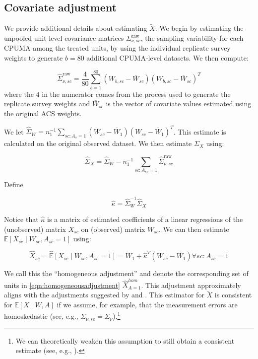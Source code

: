 \subsection{Covariate adjustment}

We provide additional details about estimating $\tilde{X}$. We begin by estimating the unpooled unit-level covariance matrices $\Sigma_{\nu, sc}^{\text{raw}}$, the sampling variability for each CPUMA among the treated units, by using the individual replicate survey weights to generate $b = 80$ additional CPUMA-level datasets. We then compute:

\begin{equation}
\hat{\Sigma}_{\nu, sc}^{\text{raw}} = \frac{4}{80}\sum_{b=1}^{80}(W_{b, sc} - \bar{W}_{sc})(W_{b, sc} - \bar{W}_{sc})^T
\end{equation}
%
where the $4$ in the numerator comes from the process used to generate the replicate survey weights and $\bar{W}_{sc}$ is the vector of covariate values estimated using the original ACS weights.

We let $\hat{\Sigma}_{W} = n_1^{-1}\sum_{sc: A_s = 1} (W_{sc} - \bar{W}_1)(W_{sc} - \bar{W}_1)^T$. This estimate is calculated on the original observed dataset. We then estimate $\Sigma_{X}$ using:

\begin{equation}
\hat{\Sigma}_X = \hat{\Sigma}_W - n_1^{-1}\sum_{sc: A_{sc} = 1} \hat{\Sigma}_{\nu, sc}^{\text{raw}}
\end{equation}

Define

\begin{equation}
\hat{\kappa} = \hat{\Sigma}_W^{-1}\hat{\Sigma}_X
\end{equation}

Notice that $\hat{\kappa}$ is a matrix of estimated coefficients of a linear regressions of the (unobserved) matrix $X_{sc}$ on (observed) matrix $W_{sc}$. We can then estimate $\mathbb{E}[X_{sc} \mid W_{sc}, A_{sc} = 1]$ using: 

\begin{equation}\label{eqn:homogeneousadjustment}
\hat{X}_{sc} = \hat{\mathbb{E}}[X_{sc} \mid W_{sc}, A_{sc} = 1] = \bar{W}_1 + \hat{\kappa}^T(W_{sc} - \bar{W}_1) \forall sc: A_{sc} = 1
\end{equation}

We call this the ``homogeneous adjustment'' and denote the corresponding set of units in \eqref{eqn:homogeneousadjustment} $\hat{X}_{A=1}^{hom}$. This adjustment approximately aligns with the adjustments suggested by \cite{carroll2006measurement} and \cite{gleser1992importance}. This estimator for $\tilde{X}$ is consistent for $\mathbb{E}[X \mid W, A]$ if we assume, for example, that the measurement errors are homoskedastic (see, e.g., $\Sigma_{\nu, sc} = \Sigma_{\nu}$).\footnote{We can theoretically weaken this assumption to still obtain a consistent estimate (see, e.g., \cite{buonaccorsi2010measurement}).}

